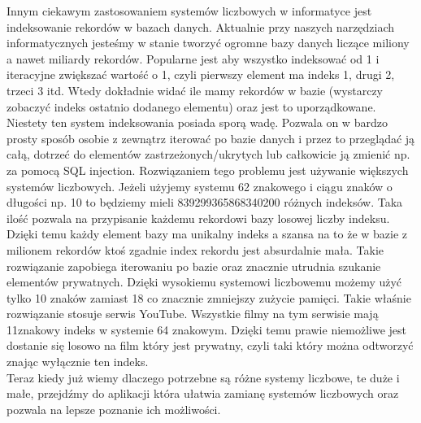 \documentclass[11pt,a4paper]{article}
\begin{document}
Innym ciekawym zastosowaniem systemów liczbowych w informatyce jest indeksowanie rekordów w bazach danych. Aktualnie przy naszych narzędziach informatycznych jesteśmy w stanie tworzyć ogromne bazy danych liczące miliony a nawet miliardy rekordów. Popularne jest aby wszystko indeksować od 1 i iteracyjne zwiększać wartość o 1, czyli pierwszy element ma indeks 1, drugi 2, trzeci 3 itd. Wtedy dokładnie widać ile mamy rekordów w bazie (wystarczy zobaczyć indeks ostatnio dodanego elementu) oraz jest to uporządkowane. Niestety ten system indeksowania posiada sporą wadę. Pozwala on w bardzo prosty sposób osobie z zewnątrz iterować po bazie danych i przez to przeglądać ją całą, dotrzeć do elementów zastrzeżonych/ukrytych lub całkowicie ją zmienić np. za pomocą SQL injection. Rozwiązaniem tego problemu jest używanie większych systemów liczbowych. Jeżeli użyjemy systemu 62 znakowego i ciągu znaków o długości np. 10 to będziemy mieli 839299365868340200 różnych indeksów. Taka ilość pozwala na przypisanie każdemu rekordowi bazy losowej liczby indeksu. Dzięki temu każdy element bazy ma unikalny indeks a szansa na to że w bazie z milionem rekordów ktoś zgadnie index rekordu jest absurdalnie mała. Takie rozwiązanie zapobiega iterowaniu po bazie oraz znacznie utrudnia szukanie elementów prywatnych. Dzięki wysokiemu systemowi liczbowemu możemy użyć tylko 10 znaków zamiast 18 co znacznie zmniejszy zużycie pamięci. Takie właśnie rozwiązanie stosuje serwis YouTube. Wszystkie filmy na tym serwisie mają 11znakowy indeks w systemie 64 znakowym. Dzięki temu prawie niemożliwe jest dostanie się losowo na film który jest prywatny, czyli taki który można odtworzyć znając wyłącznie ten indeks.\\
Teraz kiedy już wiemy dlaczego potrzebne są różne systemy liczbowe, te duże i małe, przejdźmy do aplikacji która ułatwia zamianę systemów liczbowych oraz pozwala na lepsze poznanie ich możliwości.
\end{document}
